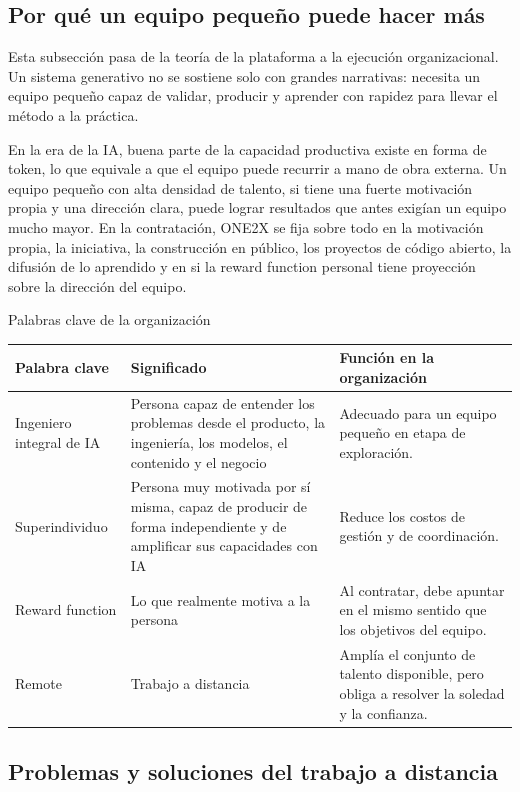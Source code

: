 \documentclass[a4paper]{article}
\begin{document}
\subsection{Por qué un equipo pequeño puede hacer más}

Esta subsección pasa de la teoría de la plataforma a la ejecución organizacional. Un sistema generativo no se sostiene solo con grandes narrativas: necesita un equipo pequeño capaz de validar, producir y aprender con rapidez para llevar el método a la práctica.

En la era de la IA, buena parte de la capacidad productiva existe en forma de token, lo que equivale a que el equipo puede recurrir a mano de obra externa. Un equipo pequeño con alta densidad de talento, si tiene una fuerte motivación propia y una dirección clara, puede lograr resultados que antes exigían un equipo mucho mayor. En la contratación, ONE2X se fija sobre todo en la motivación propia, la iniciativa, la construcción en público, los proyectos de código abierto, la difusión de lo aprendido y en si la reward function personal tiene proyección sobre la dirección del equipo.

\begin{knowledgebox}{Palabras clave de la organización}
\begin{tabularx}{\textwidth}{p{}p{}X}
\toprule
Palabra clave & Significado & Función en la organización \\
\midrule
Ingeniero integral de IA & Persona capaz de entender los problemas desde el producto, la ingeniería, los modelos, el contenido y el negocio & Adecuado para un equipo pequeño en etapa de exploración. \\
Superindividuo & Persona muy motivada por sí misma, capaz de producir de forma independiente y de amplificar sus capacidades con IA & Reduce los costos de gestión y de coordinación. \\
Reward function & Lo que realmente motiva a la persona & Al contratar, debe apuntar en el mismo sentido que los objetivos del equipo. \\
Remote & Trabajo a distancia & Amplía el conjunto de talento disponible, pero obliga a resolver la soledad y la confianza. \\
\bottomrule
\end{tabularx}
\end{knowledgebox}

\subsection{Problemas y soluciones del trabajo a distancia}
\end{document}
